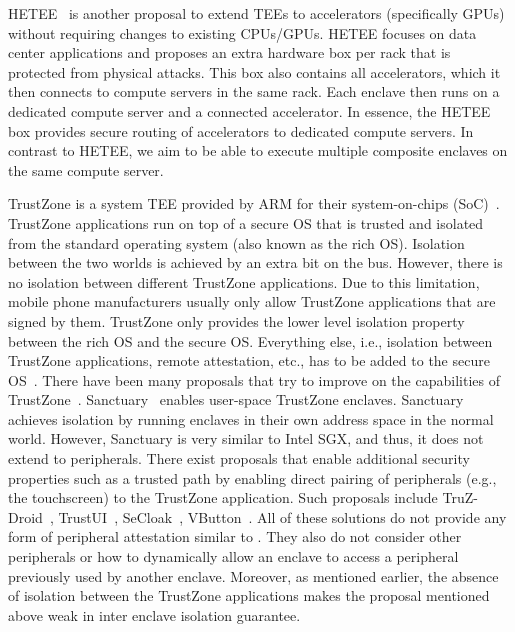  HETEE~\cite{dis2} is another proposal to extend TEEs to accelerators (specifically GPUs) without requiring changes to existing CPUs/GPUs. HETEE focuses on data center applications and proposes an extra hardware box per rack that is protected from physical attacks. This box also contains all accelerators, which it then connects to compute servers in the same rack. Each enclave then runs on a dedicated compute server and a connected accelerator. In essence, the HETEE box provides secure routing of accelerators to dedicated compute servers. In contrast to HETEE, we aim to be able to execute multiple composite enclaves on the same compute server. 


 TrustZone is a system TEE provided by ARM for their system-on-chips (SoC)~\cite{winter2008trusted}. TrustZone applications run on top of a secure OS that is trusted and isolated from the standard operating system (also known as the rich OS). Isolation between the two worlds is achieved by an extra bit on the bus. 
However, there is no isolation between different TrustZone applications. Due to this limitation, mobile phone manufacturers usually only allow TrustZone applications that are signed by them. %
TrustZone only provides the lower level isolation property between the rich OS and the secure OS. Everything else, i.e., isolation between TrustZone applications, remote attestation, etc., has to be added to the secure OS~\cite{ning2014samsungknox}. There have been many proposals that try to improve on the capabilities of TrustZone~\cite{brasser2019sanctuary,hua2017vtz}. Sanctuary~\cite{brasser2019sanctuary} enables user-space TrustZone enclaves. Sanctuary achieves isolation by running enclaves in their own address space in the normal world. However, Sanctuary is very similar to Intel SGX, and thus, it does not extend to peripherals.
There exist proposals that enable additional security properties such as a trusted path by enabling direct pairing of peripherals (e.g., the touchscreen) to the TrustZone application. Such proposals include TruZ-Droid~\cite{ying2018truz}, TrustUI~\cite{li2014building}, SeCloak~\cite{SeCloak}, VButton~\cite{li2018vbutton}. All of these solutions do not provide any form of peripheral attestation similar to \name{}. They also do not consider other peripherals or how to dynamically allow an enclave to access a peripheral previously used by another enclave. Moreover, as mentioned earlier, the absence of isolation between the TrustZone applications makes the proposal mentioned above weak in inter enclave isolation guarantee.


